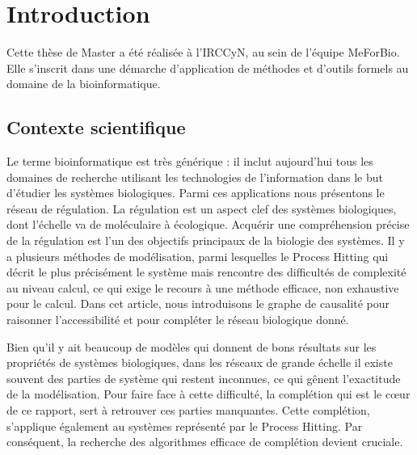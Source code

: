\documentclass[11pt]{report}
\theoremstyle{definition}
\begin{document}
\chapter*{Introduction}
\begin{spacing}{1.1}
Cette th\`ese de Master a \'et\'e r\'ealis\'ee \`a l'IRCCyN, au sein de l'\'equipe MeForBio.
Elle s'inscrit dans une d\'emarche d'application de m\'ethodes et d'outils formels au domaine de la bioinformatique.
\section*{Contexte scientifique}
Le terme bioinformatique est tr\`es g\'en\'erique : il inclut aujourd'hui tous les domaines de recherche utilisant les technologies de l'information dans le but d'\'etudier les syst\`emes biologiques. Parmi ces applications nous pr\'esentons le r\'eseau de r\'egulation. La r\'egulation est un aspect clef des syst\`emes biologiques, dont l'\'echelle va de mol\'eculaire \`a \'ecologique. Acqu\'erir une compr\'ehension pr\'ecise de la r\'egulation est l'un des objectifs principaux de la biologie des syst\`emes. Il y a plusieurs m\'ethodes de mod\'elisation, parmi lesquelles le Process Hitting qui d\'ecrit le plus pr\'ecis\'ement le syst\`eme mais rencontre des difficult\'es de complexit\'e au niveau calcul, ce qui exige le recours \`a une m\'ethode efficace, non exhaustive pour le calcul. Dans cet article, nous introduisons le graphe de causalit\'e pour raisonner l'accessibilit\'e et pour compl\'eter le r\'eseau biologique donn\'e.

Bien qu'il y ait beaucoup de mod\`eles qui donnent de bons r\'esultats sur les propri\'et\'es de syst\`emes biologiques, dans les r\'eseaux de grande \'echelle il existe souvent des parties de syst\`eme qui restent inconnues, ce qui g\^enent l'exactitude de la mod\'elisation. Pour faire face \`a cette difficult\'e, la compl\'etion qui est le c\oe ur de ce rapport, sert \`a retrouver ces parties manquantes. Cette compl\'etion, s'applique \'egalement au syst\`emes repr\'esent\'e par le Process Hitting. Par cons\'equent, la recherche des algorithmes efficace de compl\'etion devient cruciale.



\end{spacing}
\end{document}
